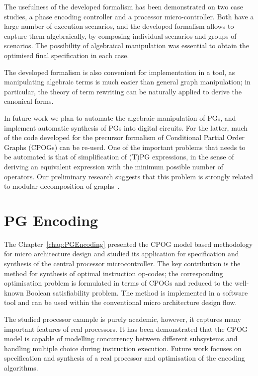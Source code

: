 The usefulness of the developed formalism has been demonstrated on
two case studies, a phase encoding controller and a processor micro-controller.
Both have a large number of execution scenarios, and the developed
formalism allows to capture them algebraically, by composing individual
scenarios and groups of scenarios. The possibility of algebraical
manipulation was essential to obtain the optimised final specification
in each case.

The developed formalism is also convenient for implementation in a
tool, as manipulating algebraic terms is much easier than general
graph manipulation; in particular, the theory of term rewriting can
be naturally applied to derive the canonical forms.

In future work we plan to automate the algebraic manipulation of PGs,
and implement automatic synthesis of PGs into digital circuits. For
the latter, much of the code developed for the precursor formalism
of Conditional Partial Order Graphs (CPOGs) can be re-used. One of
the important problems that needs to be automated is that of simplification
of (T)PG expressions, in the sense of deriving an equivalent expression
with the minimum possible number of operators. Our preliminary research
suggests that this problem is strongly related to modular decomposition
of graphs~\cite{2005_McConnell_modular}.\\

\section{PG Encoding}

The Chapter~\ref{chap:PGEncoding} presented the CPOG model based methodology for micro architecture
design and studied its application for specification and synthesis
of the central processor microcontroller. The key contribution is
the method for synthesis of optimal instruction op-codes; the corresponding
optimisation problem is formulated in terms of CPOGs and reduced to
the well-known Boolean satisfiability problem. The method is implemented
in a software tool and can be used within the conventional micro architecture
design flow.

The studied processor example is purely academic, however, it captures
many important features of real processors. It has been demonstrated
that the CPOG model is capable of modelling concurrency between different
subsystems and handling multiple choice during instruction execution.
Future work focuses on specification and synthesis of a real processor
and optimisation of the encoding algorithms.



